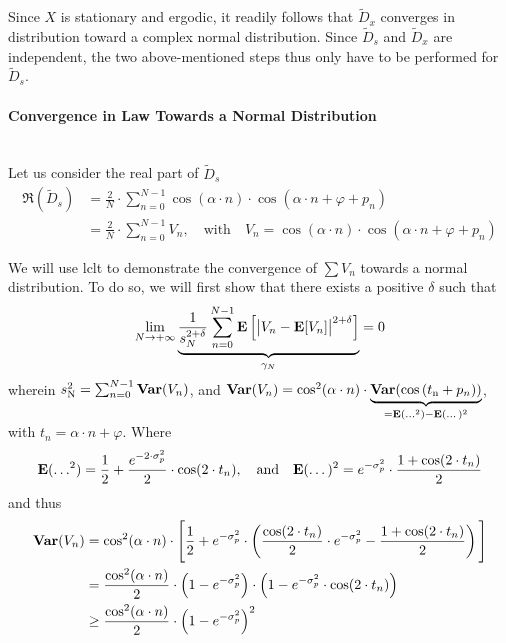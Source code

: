 Since $X$ is stationary and ergodic, it readily follows that $\widetilde{D}_x$ converges in distribution toward a complex normal distribution\cite{panaretos2013, cerovecki2017}. Since $\widetilde{D}_s$ and $\widetilde{D}_x$ are independent, the two above-mentioned steps thus only have to be performed for $\widetilde{D}_s$.

\paragraph{Convergence in Law Towards a Normal Distribution}\mbox{}\\

Let us consider the real part of $\widetilde{D}_s$
\begin{equation}
	\begin{aligned}
		\Re(\widetilde{D}_s) &= \frac{2}{N} \cdot \sum_{n=0}^{N-1} \cos \left(\alpha \cdot n\right) \cdot \cos \left( \alpha \cdot n + \varphi + p_n \right)\\
		&= \frac{2}{N} \cdot \sum_{n=0}^{N-1} V_n 
		,\quad\text{with}\quad V_n = \cos \left(\alpha \cdot n\right) \cdot \cos \left( \alpha \cdot n + \varphi + p_n \right)
	\end{aligned}
\end{equation}

We will use \gls{lclt} to demonstrate the convergence of $\sum V_n$ towards a normal distribution. To do so, we will first show that there exists a positive $\delta$ such that
\begin{equation}
	\lim_{N \rightarrow + \infty} \underbrace{\frac{1}{s_N^{2+\delta}}\sum_{n=0}^{N-1} \mathbf{E} \left[\big|V_n - \mathbf{E}[V_n]\big|^{2+\delta}\right]}_{\gamma_N} = 0
\end{equation}
wherein $s_\text{N}^2=\sum_{n=0}^{N-1} \mathbf{Var}(V_n)$, and $\mathbf{Var} (V_n) = \cos^2(\alpha \cdot n) \cdot \underbrace{\mathbf{Var} (\cos \left( t_\text{n} + p_n \right))}_{=\mathbf{E}(\dots^2) - \mathbf{E} (\dots)^2}$, with $t_n = \alpha \cdot n + \varphi$. Where
\begin{equation}
	\mathbf{E}(\dots^2) = \frac{1}{2} + \frac{e^{-2 \cdot \sigma_p^2}}{2} \cdot \cos (2\cdot t_n),\quad\text{and}\quad \mathbf{E} (\dots)^2 = e^{-\sigma_p^2} \cdot \frac{1 + \cos(2 \cdot t_n )}{2}
\end{equation}
and thus
\begin{equation}
	\begin{aligned}
		\mathbf{Var} (V_n) &= \cos^2(\alpha \cdot n) \cdot \Bigg[ \frac{1}{2} + e^{-\sigma_p^2} \cdot \left( \frac{\cos(2\cdot t_n )}{2}\cdot e^{-\sigma_p^2} - \frac{1 + \cos(2 \cdot t_n )}{2} \right) \Bigg] \\
		&= \frac{\cos^2(\alpha \cdot n)}{2} \cdot \left(1 - e^{-\sigma_p^2}\right) \cdot \left(1 - e^{-\sigma_p^2} \cdot \cos(2\cdot t_n)\right)\\
		&\geq \frac{\cos^2(\alpha \cdot n)}{2} \cdot \left(1 - e^{-\sigma_p^2}\right)^2
	\end{aligned}
\end{equation}

